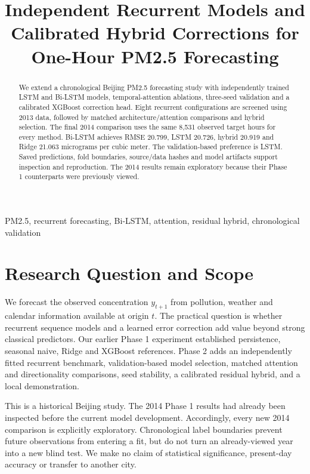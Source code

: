 \documentclass[conference]{IEEEtran}
\title{Independent Recurrent Models and Calibrated Hybrid Corrections for One-Hour PM2.5 Forecasting}
\author{\IEEEauthorblockA{\begin{tabular}{ccc}
\textbf{Samarth Khera} & \textbf{Pratham Malhotra} & \textbf{Adityaraj Pal}\\
2401010407 & 2401010343 & 2401010042\\[5pt]
\textbf{Tattva Rajput} & \textbf{Himanshu} & \\
2401010478 & 2401010188 &
\end{tabular}}\IEEEauthorblockA{CSAI Student Project 19 --- Phase 2: Deep Learning and Hybrid Forecasting}}
\begin{document}
\maketitle
\thispagestyle{plain}
\begin{abstract}
We extend a chronological Beijing PM2.5 forecasting study with independently trained LSTM and Bi-LSTM models, temporal-attention ablations, three-seed validation and a calibrated XGBoost correction head. Eight recurrent configurations are screened using 2013 data, followed by matched architecture/attention comparisons and hybrid selection. The final 2014 comparison uses the same 8,531 observed target hours for every method. Bi-LSTM achieves RMSE 20.799, LSTM 20.726, hybrid 20.919 and Ridge 21.063 micrograms per cubic meter. The validation-based preference is LSTM. Saved predictions, fold boundaries, source/data hashes and model artifacts support inspection and reproduction. The 2014 results remain exploratory because their Phase 1 counterparts were previously viewed.
\end{abstract}
\begin{IEEEkeywords}
PM2.5, recurrent forecasting, Bi-LSTM, attention, residual hybrid, chronological validation
\end{IEEEkeywords}

\section{Research Question and Scope}
We forecast the observed concentration $y_{t+1}$ from pollution, weather and calendar information available at origin $t$. The practical question is whether recurrent sequence models and a learned error correction add value beyond strong classical predictors. Our earlier Phase 1 experiment established persistence, seasonal naive, Ridge and XGBoost references. Phase 2 adds an independently fitted recurrent benchmark, validation-based model selection, matched attention and directionality comparisons, seed stability, a calibrated residual hybrid, and a local demonstration.

This is a historical Beijing study. The 2014 Phase 1 results had already been inspected before the current model development. Accordingly, every new 2014 comparison is explicitly exploratory. Chronological label boundaries prevent future observations from entering a fit, but do not turn an already-viewed year into a new blind test. We make no claim of statistical significance, present-day accuracy or transfer to another city.
\end{document}
